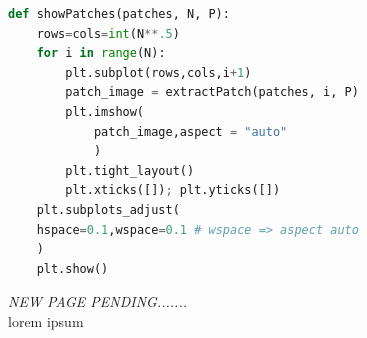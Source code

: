 \documentclass[12pt]{article}
\newcommand{\customtext}[3]{%
    \vspace{#2} %
    \fontsize{13}{8}\textcolor{#1}{\textit{#3}}%
}
\begin{document}
\begin{figure}[!htb]
\begin{minipage}[t]{.4\textwidth}
\begin{lstlisting}[language=python,style=python,basicstyle=\ttfamily\tiny]
def showPatches(patches, N, P):
    rows=cols=int(N**.5)
    for i in range(N):
        plt.subplot(rows,cols,i+1)
        patch_image = extractPatch(patches, i, P)
        plt.imshow(
            patch_image,aspect = "auto"
            )
        plt.tight_layout()
        plt.xticks([]); plt.yticks([])
    plt.subplots_adjust(
    hspace=0.1,wspace=0.1 # wspace => aspect auto
    )
    plt.show()
\end{lstlisting}
\end{minipage}
\end{figure}
\pagebreak
\begin{figure}[!htb]
    \begin{minipage}[t]{0.65\textwidth}
    \raggedright
    \customtext{xtitle}{0em}{NEW PAGE PENDING.......}\\
lorem ipsum
\end{minipage}%
\hspace{25pt}
\begin{minipage}[t]{.4\textwidth}
  \raggedright
  \scriptsize 
\end{minipage}
\end{figure}
\end{document}
